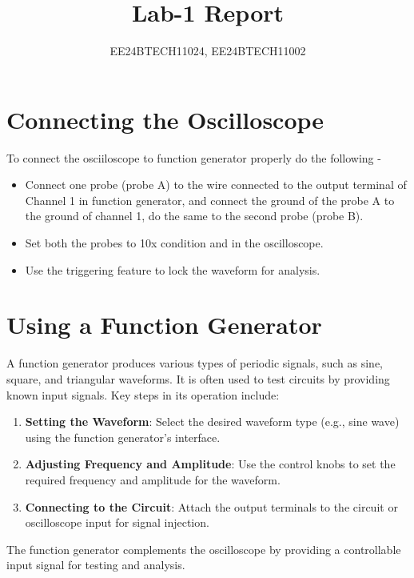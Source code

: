 \documentclass[journal]{IEEEtran}
\begin{document}

\vspace{3cm}

\title{Lab-1 Report}
\author{EE24BTECH11024, EE24BTECH11002}
{\let\newpage\relax\maketitle}

\renewcommand{\thefigure}{\theenumi}
\renewcommand{\thetable}{\theenumi}
\setlength{\intextsep}{10pt} %

\renewcommand{\thetable}{\theenumi}

\section*{Connecting the Oscilloscope}
To connect the osciiloscope to function generator properly do the following -
\begin{itemize}
    \item Connect one probe (probe A) to the wire connected to the output terminal of Channel 1 in function generator, and connect the ground of the probe A to the ground of channel 1, do the same to the second probe (probe B).
    \item Set both the probes to 10x condition and in the oscilloscope. 
    \item Use the triggering feature to lock the waveform for analysis.
\end{itemize}

\section*{Using a Function Generator}
A function generator produces various types of periodic signals, such as sine, square, and triangular waveforms. It is often used to test circuits by providing known input signals. Key steps in its operation include:
\begin{enumerate}
    \item \textbf{Setting the Waveform}: Select the desired waveform type (e.g., sine wave) using the function generator's interface.
    \item \textbf{Adjusting Frequency and Amplitude}: Use the control knobs to set the required frequency and amplitude for the waveform.
    \item \textbf{Connecting to the Circuit}: Attach the output terminals to the circuit or oscilloscope input for signal injection.
\end{enumerate}
The function generator complements the oscilloscope by providing a controllable input signal for testing and analysis.
\end{document}
